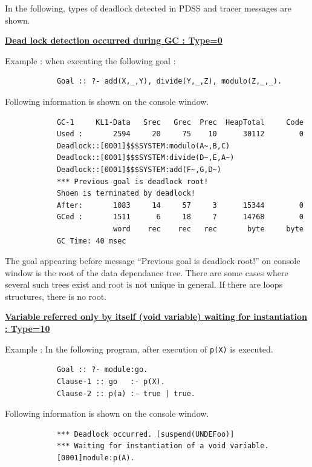 In the following, types of deadlock detected in PDSS and tracer messages are
shown.
\vspace{2ex}

\noindent\underline{\bf Dead lock detection occurred during GC : Type=0}
\vspace{1ex}\par
Example : when executing the following goal :
\begin{verbatim}
            Goal :: ?- add(X,_,Y), divide(Y,_,Z), modulo(Z,_,_).
\end{verbatim}\par
Following information is shown on the console window.
\begin{verbatim}
            GC-1     KL1-Data   Srec   Grec  Prec  HeapTotal     Code
            Used :       2594     20     75    10      30112        0
            Deadlock::[0001]$$$SYSTEM:modulo(A~,B,C)
            Deadlock::[0001]$$$SYSTEM:divide(D~,E,A~)
            Deadlock::[0001]$$$SYSTEM:add(F~,G,D~)
            *** Previous goal is deadlock root!
            Shoen is terminated by deadlock!
            After:       1083     14     57     3      15344        0
            GCed :       1511      6     18     7      14768        0
                         word    rec    rec   rec       byte     byte
            GC Time: 40 msec
\end{verbatim}\par
The goal appearing before message
``Previous goal is deadlock root!'' on console window
is the root of the data dependance tree. There are some cases where several
such trees exist and root is not unique in general. If there are loops
structures, there is no root.
\vspace{1ex}

\noindent\underline{\bf
Variable referred only by itself (void variable) waiting for instantiation : 
Type=10}
\vspace{1ex}\par
Example : In the following program, after execution of \verb|p(X)| is executed.
\begin{verbatim}
            Goal :: ?- module:go.
            Clause-1 :: go   :- p(X).
            Clause-2 :: p(a) :- true | true.
\end{verbatim}\par
Following information is shown on the console window.
\begin{verbatim}
            *** Deadlock occurred. [suspend(UNDEFoo)]
            *** Waiting for instantiation of a void variable.
            [0001]module:p(A).
\end{verbatim}
\vspace{1ex}

